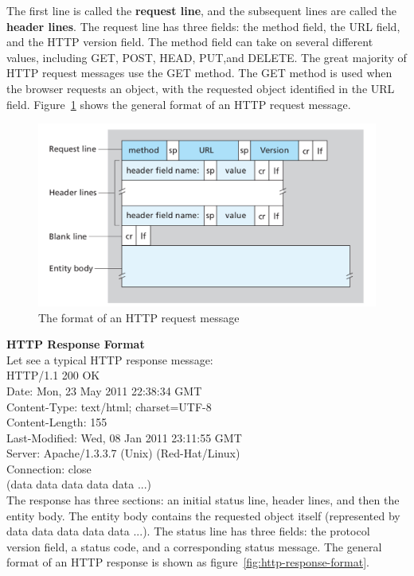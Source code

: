 \documentclass[a4paper, 11pt]{article}
\begin{document}
The first line is called the \textbf{request line}, and the subsequent lines are called the \textbf{header lines}. The request line has three fields: the method field, the URL field, and the HTTP version field. The method field can take on several different values, including GET, POST, HEAD, PUT,and DELETE. The great majority of HTTP request messages use the GET method. The GET method is used when the browser requests an object, with the requested object identified in the URL field. Figure~\ref{fig:http-request-format} shows the general format of an HTTP request message.

\begin{figure}[h]
\includegraphics[scale=0.7]{http-request-format.png}
\caption{The format of an HTTP request message}
\label{fig:http-request-format}
\end{figure}

\noindent \textbf{HTTP Response Format}\\
Let see a typical HTTP response message:\\
{\ttfamily
HTTP/1.1 200 OK\\
Date: Mon, 23 May 2011 22:38:34 GMT\\
Content-Type: text/html; charset=UTF-8\\
Content-Length: 155\\
Last-Modified: Wed, 08 Jan 2011 23:11:55 GMT\\
Server: Apache/1.3.3.7 (Unix) (Red-Hat/Linux)\\
Connection: close\\

\noindent (data data data data data ...)}\\

The response has three sections: an initial status line, header lines, and then the entity body. The entity body contains the requested object itself (represented by data data data data data ...). The status line has three fields: the protocol version field, a status code, and a corresponding status message. The general format of an HTTP response is shown as figure~\ref{fig:http-response-format}.
\end{document}

